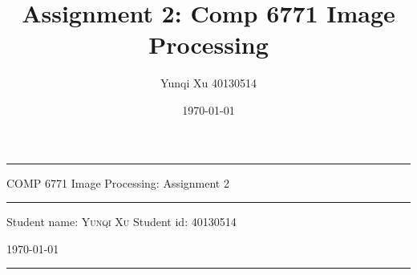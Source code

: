 \documentclass[12pt]{article}
\title{Assignment 2: Comp 6771 Image Processing}
\author{Yunqi Xu 40130514}
\date{\today}
\begin{document}

\begin{titlepage}
  \rule{\textwidth}{1pt}   %
    \vspace{0.2\textheight}  %


    {\Huge COMP 6771 Image Processing: Assignment 2}

    \vspace{0.025\textheight}   %

    \rule{0.83\textwidth}{0.4pt}  %

    \vspace{0.1\textheight}  %


    {\Large Student name: \textsc{Yunqi Xu}}
    \vfill
    {\Large Student id: 40130514}
    \vfill  %

    {\large \today}
    \vspace{0.1\textheight}  %


    \rule{\textwidth}{1pt}  %
\end{titlepage}
\end{document}
